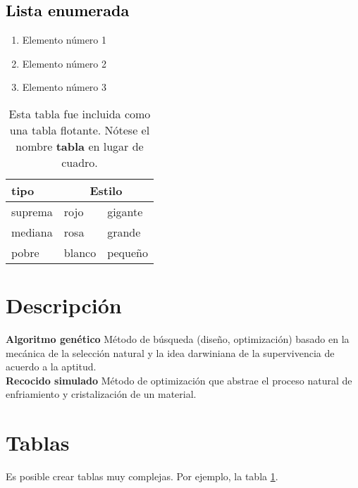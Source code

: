 \documentclass[11pt]{article}
\begin{document}
        \subsection{\textcolor{black}{Lista enumerada}}
            \begin{enumerate}[leftmargin=2cm]
                \item Elemento número 1
                \item Elemento número 2
                \item Elemento número 3
            \end{enumerate}
        \newpage    

        \begin{table}[!h]
            \renewcommand{\tablename}{Tabla}
            \centering
            \caption{Esta tabla fue incluida como una tabla flotante. Nótese el nombre \textbf{tabla} en lugar de cuadro.}
            \label{tab:tabla1} 
            \begin{tabular}{|l|l|l|} \hline
                tipo    & \multicolumn{2}{c|}{Estilo}  \\ \hline 
                suprema & rojo        & gigante        \\ \hline
                mediana & rosa        & grande         \\ \hline
                pobre   & blanco      & pequeño        \\ \hline
            \end{tabular}
        \end{table}
        

    \section{\Large Descripción} \vspace{-10pt}
        \textbf{Algoritmo genético} Método de búsqueda (diseño, optimización) basado en la mecánica de la
        selección natural y la idea darwiniana de la supervivencia de acuerdo a la aptitud. \\
        \textbf{Recocido simulado} Método de optimización que abstrae el proceso natural de enfriamiento y
        cristalización de un material.


    \section{\Large Tablas} \vspace{-10pt}
        Es posible crear tablas muy complejas. Por ejemplo, la tabla \ref{tab:tabla1}.
\end{document}
